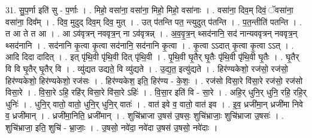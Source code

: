 \documentclass[17pt]{extarticle}
\begin{document}
31. सु॒प॒र्णा इति॑ सु - प॒र्णाः । . मिहो॒ वसा॑ना॒ वसा॑ना॒ मिहो॒ मिहो॒ वसा॑नाः । . वसा॑ना॒ दिव॒म् दिवं॒ ॅवसा॑ना॒ वसा॑ना॒ दिव᳚म् । . दिव॒ मुदुद् दिव॒म् दिव॒ मुत् । . उत् प॑तन्ति पत॒ न्त्युदुत् प॑तन्ति । . प॒त॒न्तीति॑ पतन्ति । . त आ ते त आ । . आ ऽव॑वृत्रन् नववृत्र॒न् ना ऽव॑वृत्रन्न् । . अ॒व॒वृ॒त्र॒न् थ्सद॑नानि॒ सद॑ नान्यववृत्रन् नववृत्र॒न् थ्सद॑नानि । . सद॑नानि कृ॒त्वा कृ॒त्वा सद॑नानि॒ सद॑नानि कृ॒त्वा । . कृ॒त्वा ऽऽदात् कृ॒त्वा कृ॒त्वा ऽऽत् । . आदि दिदा दादित् । . इत् पृ॑थि॒वी पृ॑थि॒वी दित् पृ॑थि॒वी । . पृ॒थि॒वी घृ॒तैर् घृ॒तैः पृ॑थि॒वी पृ॑थि॒वी घृ॒तैः । . घृ॒तैर् वि वि घृ॒तैर् घृ॒तैर् वि । . व्यु॑द्यत उद्यते॒ वि व्यु॑द्यते । . उ॒द्य॒त॒ इत्यु॑द्यते । . हिर॑ण्यकेशो॒ रज॑सो॒ रज॑सो॒ हिर॑ण्यकेशो॒ हिर॑ण्यकेशो॒ रज॑सः । . हिर॑ण्यकेश॒ इति॒ हिर॑ण्य - के॒शः॒ । . रज॑सो विसा॒रे वि॑सा॒रे रज॑सो॒ रज॑सो विसा॒रे । . वि॒सा॒रे ऽहि॒ रहि॑र् विसा॒रे वि॑सा॒रे ऽहिः॑ । . वि॒सा॒र इति॑ वि - सा॒रे । . अहि॒र् धुनि॒र् धुनि॒ रहि॒ रहि॒र् धुनिः॑ । . धुनि॒र् वातो॒ वातो॒ धुनि॒र् धुनि॒र् वातः॑ । . वात॑ इवे व॒ वातो॒ वात॑ इव । . इ॒व॒ ध्रजी॑मा॒न् ध्रजी॑मा निवे व॒ ध्रजी॑मान् । . ध्रजी॑मा॒निति॒ ध्रजी॑मान् । . शुचि॑भ्राजा उ॒षस॑ उ॒षसः॒ शुचि॑भ्राजाः॒ शुचि॑भ्राजा उ॒षसः॑ । . शुचि॑भ्राजा॒ इति॒ शुचि॑ - भ्रा॒जाः॒ । . उ॒षसो॒ नवे॑दा॒ नवे॑दा उ॒षस॑ उ॒षसो॒ नवे॑दाः । \newline
\pagebreak
{}
\end{document}
